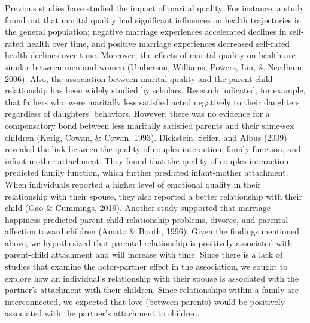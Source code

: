 \documentclass[man]{apa6}
\begin{document}
Previous studies have studied the impact of marital quality. For instance, a study found out that marital quality had significant influences on health trajectories in the general population; negative marriage experiences accelerated declines in self-rated health over time, and positive marriage experiences decreased self-rated health declines over time. Moreover, the effects of marital quality on health are similar between men and women (Umberson, Williams, Powers, Liu, \& Needham, 2006). Also, the association between marital quality and the parent-child relationship has been widely studied by scholars. Research indicated, for example, that fathers who were maritally less satisfied acted negatively to their daughters regardless of daughters' behaviors. However, there was no evidence for a compensatory bond between less maritally satisfied parents and their same-sex children (Kerig, Cowan, \& Cowan, 1993). Dickstein, Seifer, and Albus (2009) revealed the link between the quality of couples interaction, family function, and infant-mother attachment. They found that the quality of couples interaction predicted family function, which further predicted infant-mother attachment. When individuals reported a higher level of emotional quality in their relationship with their spouse, they also reported a better relationship with their child (Gao \& Cummings, 2019). Another study supported that marriage happiness predicted parent-child relationship problems, divorce, and parental affection toward children (Amato \& Booth, 1996). Given the findings mentioned above, we hypothesized that parental relationship is positively associated with parent-child attachment and will increase with time. Since there is a lack of studies that examine the actor-partner effect in the association, we sought to explore how an individual's relationship with their spouse is associated with the partner's attachment with their children. Since relationships within a family are interconnected, we expected that love (between parents) would be positively associated with the partner's attachment to children.
\end{document}
